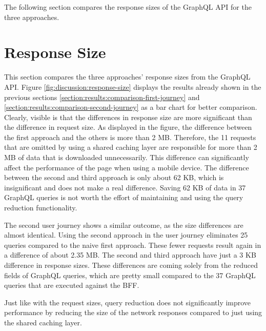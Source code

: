 \noindent The following section compares the response sizes of the GraphQL \ac{API} for the three approaches.

\section{Response Size}\label{section:discussion:response-size}

This section compares the three approaches' response sizes from the GraphQL \ac{API}. Figure \ref{fig:discussion:response-size} displays the results already shown in the previous sections \ref{section:results:comparison-first-journey} and \ref{section:results:comparison-second-journey} as a bar chart for better comparison. Clearly, visible is that the differences in response size are more significant than the difference in request size. As displayed in the figure, the difference between the first approach and the others is more than 2 MB. Therefore, the 11 requests that are omitted by using a shared caching layer are responsible for more than 2 MB of data that is downloaded unnecessarily. This difference can significantly affect the performance of the page when using a mobile device. The difference between the second and third approach is only about 62 KB, which is insignificant and does not make a real difference. Saving 62 KB of data in 37 GraphQL queries is not worth the effort of maintaining and using the query reduction functionality. 

\bigskip

\noindent The second user journey shows a similar outcome, as the size differences are almost identical. Using the second approach in the user journey eliminates 25 queries compared to the naive first approach. These fewer requests result again in a difference of about 2.35 MB. The second and third approach have just a 3 KB difference in response sizes. These differences are coming solely from the reduced fields of GraphQL queries, which are pretty small compared to the 37 GraphQL queries that are executed against the \ac{BFF}.

\bigskip

\noindent Just like with the request sizes, query reduction does not significantly improve performance by reducing the size of the network responses compared to just using the shared caching layer.

